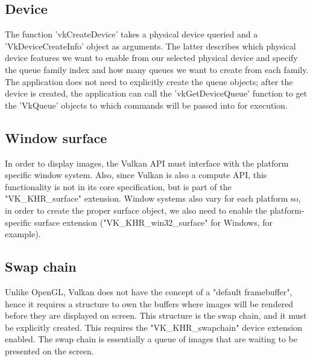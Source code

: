 \subsection{Device}
The function 'vkCreateDevice' takes a physical device queried and a 'VkDeviceCreateInfo' object as arguments. The latter describes which physical device features we want to enable from our selected physical device and specify the queue family index and how many queues we want to create from each family. The application does not need to explicitly create the queue objects; after the device is created, the application can call the 'vkGetDeviceQueue' function to get the 'VkQueue' objects to which commands will be passed into for execution.

\subsection{Window surface}
In order to display images, the Vulkan API must interface with the platform specific window system. Also, since Vulkan is also a compute API, this functionality is not in its core specification, but is part of the "VK\_KHR\_surface" extension. Window systems also vary for each platform so, in order to create the proper surface object, we also need to enable the platform-specific surface extension ("VK\_KHR\_win32\_surface" for Windows, for example).

\subsection{Swap chain}
Unlike OpenGL, Vulkan does not have the concept of a "default framebuffer", hence it requires a structure to own the buffers where images will be rendered before they are displayed on screen. This structure is the swap chain, and it must be explicitly created. This requires the "VK\_KHR\_swapchain" device extension enabled. The swap chain is essentially a queue of images that are waiting to be presented on the screen.

